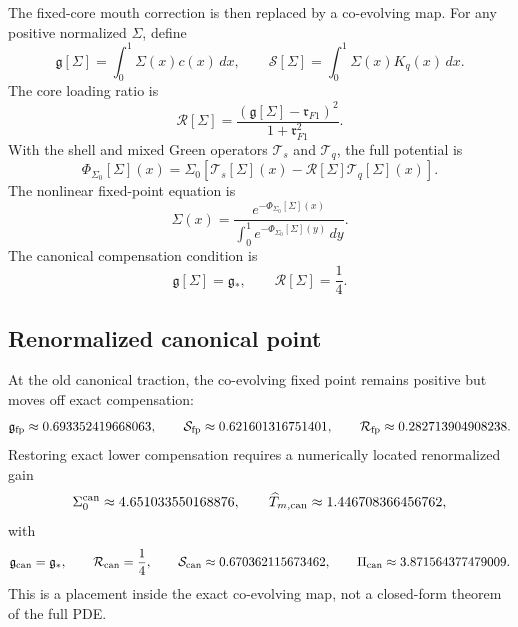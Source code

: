 The fixed-core mouth correction is then replaced by a co-evolving map.  For any positive normalized \(\Sigma\), define
\begin{equation}
\label{eq:part04-gS-functionals}
\mathfrak g[\Sigma]=\int_0^1\Sigma(x)c(x)\,dx,
\qquad
\mathcal S[\Sigma]=\int_0^1\Sigma(x)K_q(x)\,dx.
\end{equation}
The core loading ratio is
\begin{equation}
\label{eq:part04-R-Sigma}
\mathcal R[\Sigma]
=
\frac{(\mathfrak g[\Sigma]-\mathfrak r_{F1})^2}{1+\mathfrak r_{F1}^2}.
\end{equation}
With the shell and mixed Green operators \(\mathcal T_s\) and \(\mathcal T_q\), the full potential is
\begin{equation}
\label{eq:part04-Phi-Sigma}
\Phi_{\Sigma_0}[\Sigma](x)
=
\Sigma_0\left[
\mathcal T_s[\Sigma](x)-\mathcal R[\Sigma]\mathcal T_q[\Sigma](x)
\right].
\end{equation}
The nonlinear fixed-point equation is
\begin{equation}
\label{eq:part04-coevolving-fixedpoint}
\Sigma(x)=\frac{e^{-\Phi_{\Sigma_0}[\Sigma](x)}}{\int_0^1e^{-\Phi_{\Sigma_0}[\Sigma](y)}\,dy}.
\end{equation}
The canonical compensation condition is
\begin{equation}
\label{eq:part04-coevolving-canonical-condition}
\mathfrak g[\Sigma]=\mathfrak g_*,
\qquad
\mathcal R[\Sigma]=\frac14.
\end{equation}

\subsection{Renormalized canonical point}
\label{subsec:part04-renormalized-canonical-point}

At the old canonical traction, the co-evolving fixed point remains positive but moves off exact compensation:
\begin{equation}
\label{eq:part04-frozen-traction-values}
\mathfrak g_{\rm fp}\approx0.693352419668063,
\qquad
\mathcal S_{\rm fp}\approx0.621601316751401,
\qquad
\mathcal R_{\rm fp}\approx0.282713904908238.
\end{equation}
Restoring exact lower compensation requires a numerically located renormalized gain
\begin{equation}
\label{eq:part04-renormalized-Sigma0}
\Sigma_0^{\rm can}\approx4.651033550168876,
\qquad
\widehat T_{m,{\rm can}}\approx1.446708366456762,
\end{equation}
with
\begin{equation}
\label{eq:part04-renormalized-canonical-values}
\mathfrak g_{\rm can}=\mathfrak g_*,
\qquad
\mathcal R_{\rm can}=\frac14,
\qquad
\mathcal S_{\rm can}\approx0.670362115673462,
\qquad
\Pi_{\rm can}\approx3.871564377479009.
\end{equation}
This is a \StatusNumerical{} placement inside the exact co-evolving map, not a closed-form theorem of the full PDE.


